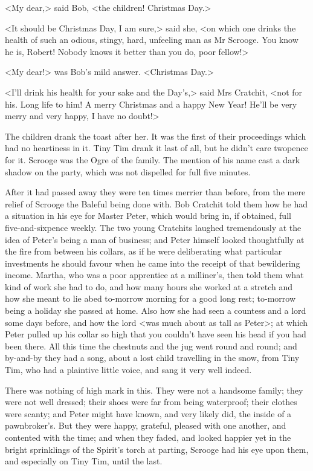 <My dear,> said Bob, <the children! Christmas Day.>

<It should be Christmas Day, I am sure,> said she, <on which one drinks the
health of such an odious, stingy, hard, unfeeling man as Mr Scrooge. You know he
is, Robert! Nobody knows it better than you do, poor fellow!>

<My dear!> was Bob's mild answer. <Christmas Day.>

<I'll drink his health for your sake and the Day's,> said Mrs Cratchit, <not for
his. Long life to him! A merry Christmas and a happy New Year! He'll be very
merry and very happy, I have no doubt!>

The children drank the toast after her. It was the first of their proceedings
which had no heartiness in it. Tiny Tim drank it last of all, but he didn't care
twopence for it. Scrooge was the Ogre of the family. The mention of his name
cast a dark shadow on the party, which was not dispelled for full five minutes.

After it had passed away they were ten times merrier than before, from the mere
relief of Scrooge the Baleful being done with. Bob Cratchit told them how he had
a situation in his eye for Master Peter, which would bring in, if obtained, full
five-and-sixpence weekly. The two young Cratchits laughed tremendously at the
idea of Peter's being a man of business; and Peter himself looked thoughtfully
at the fire from between his collars, as if he were deliberating what particular
investments he should favour when he came into the receipt of that bewildering
income. Martha, who was a poor apprentice at a milliner's, then told them what
kind of work she had to do, and how many hours she worked at a stretch and how
she meant to lie abed to-morrow morning for a good long rest; to-morrow being a
holiday she passed at home. Also how she had seen a countess and a lord some
days before, and how the lord <was much about as tall as Peter>; at which Peter
pulled up his collar so high that you couldn't have seen his head if you had
been there. All this time the chestnuts and the jug went round and round; and
by-and-by they had a song, about a lost child travelling in the snow, from Tiny
Tim, who had a plaintive little voice, and sang it very well indeed.

There was nothing of high mark in this. They were not a handsome family; they
were not well dressed; their shoes were far from being waterproof; their clothes
were scanty; and Peter might have known, and very likely did, the inside of a
pawnbroker's. But they were happy, grateful, pleased with one another, and
contented with the time; and when they faded, and looked happier yet in the
bright sprinklings of the Spirit's torch at parting, Scrooge had his eye upon
them, and especially on Tiny Tim, until the last.

